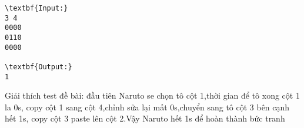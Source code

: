 \begin{verbatim}
\textbf{Input:}
3 4
0000
0110
0000

\textbf{Output:}
1
\end{verbatim}

   Giải thích test đề bài: đầu tiên Naruto se chọn tô cột 1,thời gian để tô xong cột 1 la 0s, copy cột 1 sang cột 4,chỉnh sửa lại mất 0s,chuyển sang tô cột 3 bên cạnh hết 1s, copy cột 3 paste lên cột 2.Vậy Naruto hết 1s để hoàn thành bức tranh